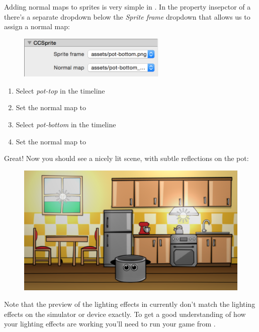 Adding normal maps to sprites is very simple in \SB{}. In the property
insepctor of a \ccsprite{} there's a separate dropdown below the \textit{Sprite
frame} dropdown that allows us to assign a normal map:

\begin{figure}[H]
  \centering
  \includegraphics[width=200pt]{images/Chapter9/select_normal_map.png}
\end{figure}

\begin{leftbar}
\begin{enumerate}
  \item Select \textit{pot-top} in the timeline 
  \item Set the normal map to 
  \item Select \textit{pot-bottom} in the timeline
  \item Set the normal map to 
\end{enumerate}
\end{leftbar}

Great! Now you should see a nicely lit scene, with subtle reflections on the
pot:

\begin{figure}[H]
  \centering
  \includegraphics[width=350pt]{images/Chapter9/lighting_finished.png}
\end{figure}

Note that the preview of the lighting effects in \SB{} currently don't match the
lighting effects on the simulator or device exactly. To get a good understanding
of how your lighting effects are working you'll need to run your game from
\xcode{}.


